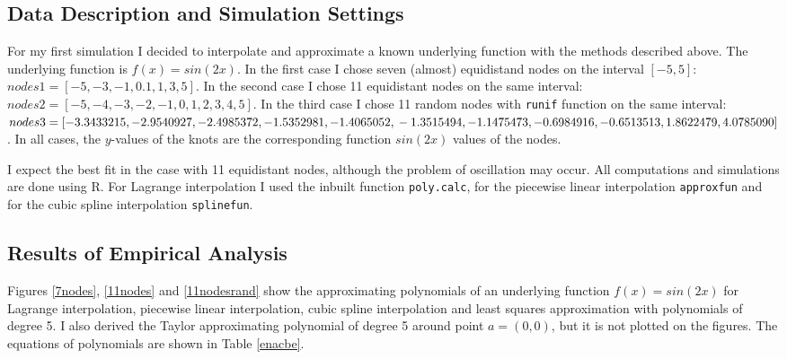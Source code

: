 \documentclass[a4paper,10pt]{article}
\begin{document}
\subsection{Data Description and Simulation Settings}
For my first simulation I decided to interpolate and approximate a known underlying function with the methods described above. 
The underlying function is $f(x)=sin(2x)$.
In the first case I chose seven (almost) equidistand nodes on the interval $[-5,5]$: $nodes1=[-5,-3,-1,0.1,1,3,5]$.
In the second case I chose 11 equidistant nodes on the same interval: $nodes2=[-5,-4,-3,-2,-1,0,1,2,3,4,5]$.
In the third case I chose 11 random nodes with \texttt{runif} function on the same interval: $nodes3= [-3.3433215, -2.9540927, -2.4985372, -1.5352981, -1.4065052, \\ -1.3515494, -1.1475473, -0.6984916, -0.6513513 , 1.8622479 , 4.0785090]$.
In all cases, the $y$-values of the knots are the corresponding function $sin(2x)$ values of the nodes.


I expect the best fit in the case with 11 equidistant nodes, although the problem of oscillation may occur.
All computations and simulations are done using R. For Lagrange interpolation I used the inbuilt function \texttt{poly.calc}, for the piecewise linear interpolation \texttt{approxfun} and for the cubic spline interpolation \texttt{splinefun}.

\subsection{Results of Empirical Analysis}
Figures \ref{7nodes}, \ref{11nodes} and \ref{11nodesrand} show the approximating polynomials of an underlying function $f(x)=sin(2x)$ for Lagrange interpolation, piecewise linear interpolation, cubic spline interpolation and least squares approximation with polynomials of degree 5.
I also derived the Taylor approximating polynomial of degree 5 around point $a=(0,0)$, but it is not plotted on the figures. The equations of polynomials are shown in Table \ref{enacbe}.
\end{document}
